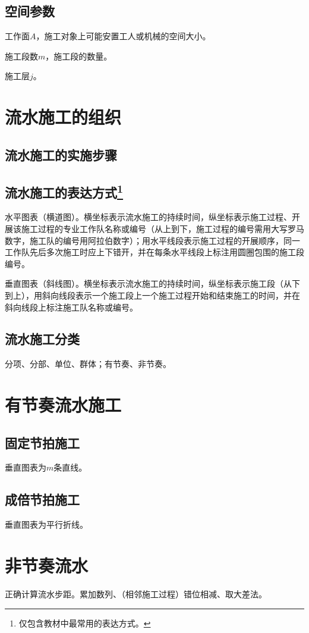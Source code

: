 \documentclass{book}
\begin{document}
\subsection{空间参数}
\par 工作面$A$，施工对象上可能安置工人或机械的空间大小。
\par 施工段数$m$，施工段的数量。
\par 施工层$j$。
\section{流水施工的组织}
\subsection{流水施工的实施步骤}
\subsection{流水施工的表达方式\footnote{仅包含教材中最常用的表达方式。}}
\par 水平图表（横道图）。横坐标表示流水施工的持续时间，纵坐标表示施工过程、开展该施工过程的专业工作队名称或编号（从上到下，施工过程的编号需用大写罗马数字，施工队的编号用阿拉伯数字）；用水平线段表示施工过程的开展顺序，同一工作队先后多次施工时应上下错开，并在每条水平线段上标注用圆圈包围的施工段编号。
\par 垂直图表（斜线图）。横坐标表示流水施工的持续时间，纵坐标表示施工段（从下到上），用斜向线段表示一个施工段上一个施工过程开始和结束施工的时间，并在斜向线段上标注施工队名称或编号。
\subsection{流水施工分类}
\par 分项、分部、单位、群体；有节奏、非节奏。
\section{有节奏流水施工}
\subsection{固定节拍施工}
\par 垂直图表为$m$条直线。
\subsection{成倍节拍施工}
\par 垂直图表为平行折线。
\section{非节奏流水}
\par 正确计算流水步距。累加数列、（相邻施工过程）错位相减、取大差法。
\end{document}
